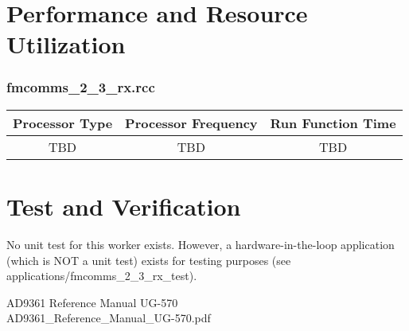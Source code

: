 \section*{Performance and Resource Utilization}
\subsubsection*{fmcomms\_2\_3\_rx.rcc}
\begin{scriptsize}
	\begin{tabular}{|c|c|c|}
		\hline
		\rowcolor{blue}
		Processor Type & Processor Frequency & Run Function Time \\
		\hline
		TBD            & TBD                 & TBD               \\
		\hline
	\end{tabular}
\end{scriptsize}

\section*{Test and Verification}
No unit test for this worker exists. However, a hardware-in-the-loop application (which is NOT a unit test) exists for testing purposes (see applications/fmcomms\_2\_3\_rx\_test).

 \begin{thebibliography}{1}


  AD9361 Reference Manual UG-570\\
 AD9361\_Reference\_Manual\_UG-570.pdf
 \end{thebibliography}


